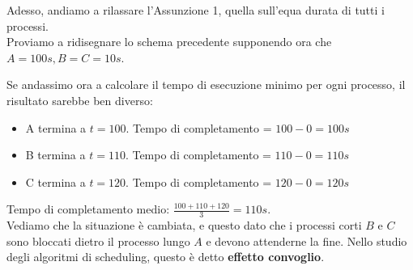 \documentclass[12pt]{report}
\begin{document}
	Adesso, andiamo a rilassare l'Assunzione 1, quella sull'equa durata di tutti i processi.\\
	Proviamo a ridisegnare lo schema precedente supponendo ora che $A = 100s, B=C=10s$.
	
	\begin{figure}[htbp]
		\centering
	\end{figure}
	Se andassimo ora a calcolare il tempo di esecuzione minimo per ogni processo, il risultato sarebbe ben diverso:
	\begin{itemize}
		\item A termina a $t=100$. Tempo di completamento = $100-0=100s$
		\item B termina a $t=110$. Tempo di completamento = $110-0=110s$
		\item C termina a $t=120$. Tempo di completamento = $120-0=120s$
	\end{itemize}
	Tempo di completamento medio: $\frac{100+110+120}{3} = 110s$.\\
	Vediamo che la situazione è cambiata, e questo dato che i processi corti $B$ e $C$ sono bloccati dietro il processo lungo $A$ e devono attenderne la fine. Nello studio degli algoritmi di scheduling, questo è detto \textbf{effetto convoglio}.
	
\end{document}
